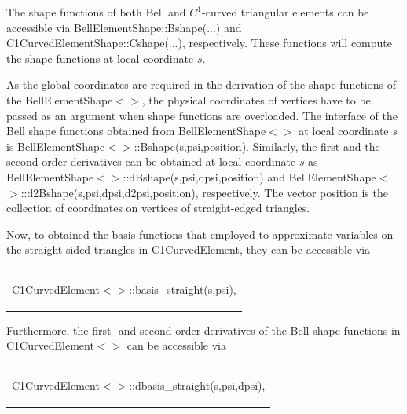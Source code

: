 The shape functions of both Bell and $ C^1 $-\/curved triangular elements can be accessible via {\ttfamily Bell\+Element\+Shape\+::\+Bshape}(...) and {\ttfamily C1\+Curved\+Element\+Shape\+::\+Cshape}(...), respectively. These functions will compute the shape functions at local coordinate $ s. $

As the global coordinates are required in the derivation of the shape functions of the {\ttfamily Bell\+Element\+Shape$<$$>$}, the physical coordinates of vertices have to be passed as an argument when shape functions are overloaded. The interface of the Bell shape functions obtained from {\ttfamily Bell\+Element\+Shape$<$$>$} at local coordinate $ s $ is {\ttfamily Bell\+Element\+Shape$<$$>$\+::\+Bshape(s,psi,position)}. Similarly, the first and the second-\/order derivatives can be obtained at local coordinate $ s $ as {\ttfamily Bell\+Element\+Shape$<$$>$\+::d\+Bshape(s,psi,dpsi,position)} and {\ttfamily Bell\+Element\+Shape$<$$>$\+::d2\+Bshape(s,psi,dpsi,d2psi,position)}, respectively. The vector {\ttfamily position} is the collection of coordinates on vertices of straight-\/edged triangles.

Now, to obtained the basis functions that employed to approximate variables on the straight-\/sided triangles in {\ttfamily C1\+Curved\+Element}, they can be accessible via

\begin{center} \tabulinesep=1mm
\begin{longtabu} spread 0pt [c]{*{1}{|X[-1]}|}
\hline
\begin{center} {\ttfamily C1\+Curved\+Element$<$$>$\+::basis\+\_\+straight(s,psi)}, \end{center}    \\
\end{longtabu}
\end{center} 

Furthermore, the first-\/ and second-\/order derivatives of the Bell shape functions in {\ttfamily C1\+Curved\+Element$<$$>$} can be accessible via

\begin{center} \tabulinesep=1mm
\begin{longtabu} spread 0pt [c]{*{1}{|X[-1]}|}
\hline
\begin{center} {\ttfamily C1\+Curved\+Element$<$$>$\+::dbasis\+\_\+straight(s,psi,dpsi)}, \end{center}    \\
\end{longtabu}
\end{center} 

